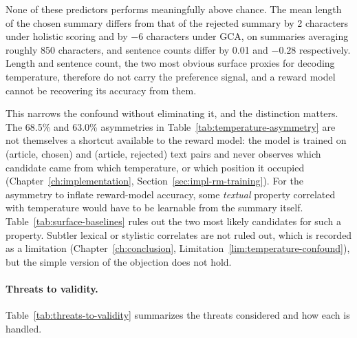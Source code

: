 None of these predictors performs meaningfully above chance. The mean length of
the chosen summary differs from that of the rejected summary by 2 characters
under holistic scoring and by $-6$ characters under GCA, on summaries averaging
roughly 850 characters, and sentence counts differ by 0.01 and $-0.28$
respectively. Length and sentence count, the two most obvious surface proxies
for decoding temperature, therefore do not carry the preference signal, and a
reward model cannot be recovering its accuracy from them.

This narrows the confound without eliminating it, and the distinction matters.
The 68.5\% and 63.0\% asymmetries in
Table~\ref{tab:temperature-asymmetry} are not themselves a shortcut available to
the reward model: the model is trained on (article, chosen) and (article,
rejected) text pairs and never observes which candidate came from which
temperature, or which position it occupied
(Chapter~\ref{ch:implementation}, Section~\ref{sec:impl-rm-training}). For the
asymmetry to inflate reward-model accuracy, some \emph{textual} property
correlated with temperature would have to be learnable from the summary itself.
Table~\ref{tab:surface-baselines} rules out the two most likely candidates for
such a property. Subtler lexical or stylistic correlates are not ruled out,
which is recorded as a limitation
(Chapter~\ref{ch:conclusion}, Limitation~\ref{lim:temperature-confound}),
but the simple version of the objection does not hold.

\paragraph{Threats to validity.} Table~\ref{tab:threats-to-validity} summarizes
the threats considered and how each is handled.

